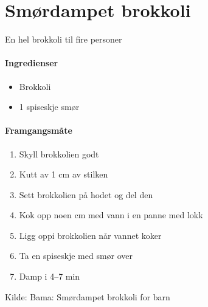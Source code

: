 \section{﻿Smørdampet brokkoli}
\label{brokkoli}
En hel brokkoli til fire personer

\paragraph{Ingredienser}
\begin{itemize}[noitemsep]
	\item Brokkoli
	\item 1 spiseskje smør
\end{itemize}

\paragraph{Framgangsmåte}
\begin{enumerate}[noitemsep]
	\item Skyll brokkolien godt
	\item Kutt av 1 cm av stilken
	\item Sett brokkolien på hodet og del den
	\item Kok opp noen cm med vann i en panne med lokk
	\item Ligg oppi brokkolien når vannet koker
	\item Ta en spiseskje med smør over
	\item Damp i 4--7 min
\end{enumerate}

Kilde: Bama: Smørdampet brokkoli for barn
